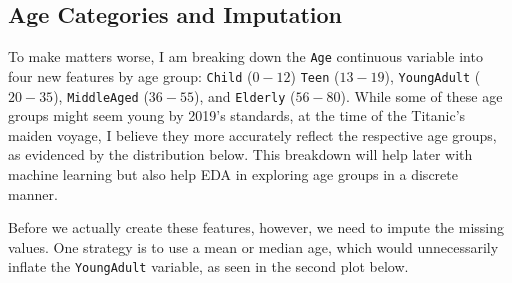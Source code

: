 \documentclass[]{article}
\begin{document}
\subsection{Age Categories and
Imputation}\label{age-categories-and-imputation}

To make matters worse, I am breaking down the \texttt{Age} continuous
variable into four new features by age group: \texttt{Child} (\(0-12\))
\texttt{Teen} (\(13-19\)), \texttt{YoungAdult} (\(20-35\)),
\texttt{MiddleAged} (\(36-55\)), and \texttt{Elderly} (\(56-80\)). While
some of these age groups might seem young by 2019's standards, at the
time of the Titanic's maiden voyage, I believe they more accurately
reflect the respective age groups, as evidenced by the distribution
below. This breakdown will help later with machine learning but also
help EDA in exploring age groups in a discrete manner.

Before we actually create these features, however, we need to impute the
missing values. One strategy is to use a mean or median age, which would
unnecessarily inflate the \texttt{YoungAdult} variable, as seen in the
second plot below.
\end{document}
